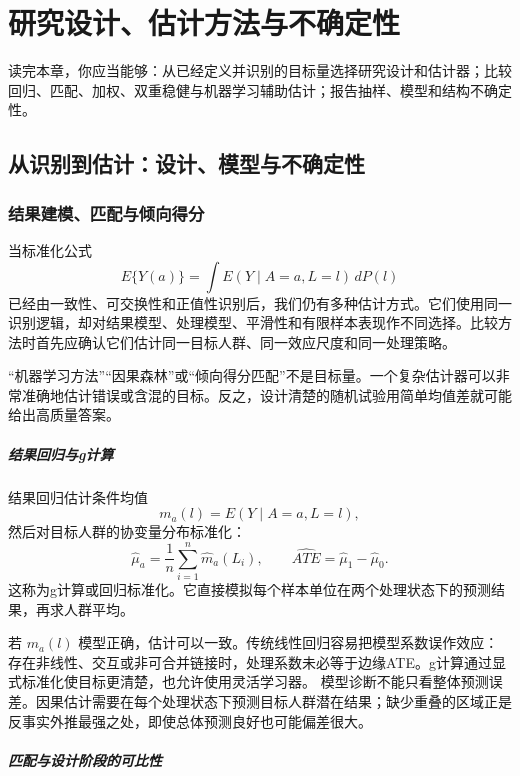 \chapter{研究设计、估计方法与不确定性}
\label{ch:design-estimation}

\begin{learninggoals}
读完本章，你应当能够：从已经定义并识别的目标量选择研究设计和估计器；比较回归、匹配、加权、双重稳健与机器学习辅助估计；报告抽样、模型和结构不确定性。
\end{learninggoals}

\section{从识别到估计：设计、模型与不确定性}

\subsection{结果建模、匹配与倾向得分}

当标准化公式
\[
E\{Y(a)\}=\int E(Y\mid A=a,L=l)\,dP(l)
\]
已经由一致性、可交换性和正值性识别后，我们仍有多种估计方式。它们使用同一识别逻辑，却对结果模型、处理模型、平滑性和有限样本表现作不同选择。比较方法时首先应确认它们估计同一目标人群、同一效应尺度和同一处理策略。

“机器学习方法”“因果森林”或“倾向得分匹配”不是目标量。一个复杂估计器可以非常准确地估计错误或含混的目标。反之，设计清楚的随机试验用简单均值差就可能给出高质量答案。

\paragraph{结果回归与g计算}

结果回归估计条件均值
\[
m_a(l)=E(Y\mid A=a,L=l),
\]
然后对目标人群的协变量分布标准化：
\[
\widehat\mu_a=\frac{1}{n}\sum_{i=1}^n \widehat m_a(L_i),
\qquad
\widehat{ATE}=\widehat\mu_1-\widehat\mu_0.
\]
这称为g计算或回归标准化。它直接模拟每个样本单位在两个处理状态下的预测结果，再求人群平均。

若 $m_a(l)$ 模型正确，估计可以一致。传统线性回归容易把模型系数误作效应：存在非线性、交互或非可合并链接时，处理系数未必等于边缘ATE。g计算通过显式标准化使目标更清楚，也允许使用灵活学习器。
模型诊断不能只看整体预测误差。因果估计需要在每个处理状态下预测目标人群潜在结果；缺少重叠的区域正是反事实外推最强之处，即使总体预测良好也可能偏差很大。

\paragraph{匹配与设计阶段的可比性}

